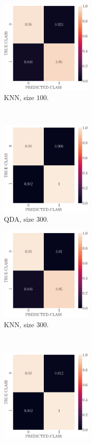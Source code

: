 \documentclass[12pt, a4 paper]{article}
\begin{document}
\begin{figure}[!htbp]
\begin{subfigure}[!htbp]{0.24\textwidth}
       \centering
       \includegraphics[width=1.8in]{../results/ex2/conf_mtx_KNN_dataset_P2c_size_100.pdf}
       \caption{KNN, size $100$.}
       \label{fig:KNN_rr20_P2c_100}
    \end{subfigure}
\\
    \begin{subfigure}[!htbp]{0.24\textwidth}
       \centering
       \includegraphics[width=1.8in]{../results/ex2/conf_mtx_QD_ML_dataset_P2c_size_300.pdf}
       \caption{QDA, size $300$.}
       \label{fig:QDA_rr20_P2c_300}
    \end{subfigure}
\quad \quad
    \begin{subfigure}[!htbp]{0.24\textwidth}
       \centering
       \includegraphics[width=1.8in]{../results/ex2/conf_mtx_KNN_dataset_P2c_size_300.pdf}
       \caption{KNN, size $300$.}
       \label{fig:KNN_rr20_P2c_300}
    \end{subfigure}
\\
    \begin{subfigure}[!htbp]{0.24\textwidth}
       \centering
       \includegraphics[width=1.8in]{../results/ex2/conf_mtx_QD_ML_dataset_P2c_size_999.pdf}

\end{subfigure}
\end{figure}
\end{document}
